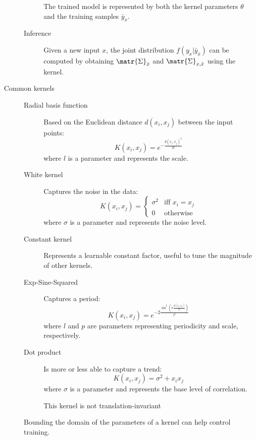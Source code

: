 \begin{description}
\begin{description}
                The trained model is represented by both the kernel parameters $\theta$ and the training samples $\bar{y}_x$.

            \item[Inference] 
                Given a new input $x$, the joint distribution $f(y_x | \bar{y}_{\bar{x}})$ can be computed by obtaining $\matr{\Sigma}_{\bar{x}}$ and $\matr{\Sigma}_{x, \bar{x}}$ using the kernel.
        \end{description}

    \item[Common kernels] \phantom{}
        \begin{description}
            \item[Radial basis function] 
                Based on the Euclidean distance $d(x_i, x_j)$ between the input points:
                \[ K(x_i, x_j) = e^{-\frac{d(x_i, x_j)^2}{2l}} \]
                where $l$ is a parameter and represents the scale.

            \item[White kernel]
                Captures the noise in the data:
                \[ K(x_i, x_j) = \begin{cases}
                    \sigma^2 & \text{iff $x_i = x_j$} \\
                    0 & \text{otherwise}
                \end{cases} \]
                where $\sigma$ is a parameter and represents the noise level.

            \item[Constant kernel]
                Represents a learnable constant factor, useful to tune the magnitude of other kernels.

            \item[Exp-Sine-Squared]
                Captures a period:
                \[ K(x_i, x_j) = e^{-2 \frac{\sin^2 \left( \pi \frac{d(x_i, x_j)}{p} \right)}{l^2}} \]
                where $l$ and $p$ are parameters representing periodicity and scale, respectively.

            \item[Dot product]
                Is more or less able to capture a trend:
                \[ K(x_i, x_j) = \sigma^2 + x_i x_j \]
                where $\sigma$ is a parameter and represents the base level of correlation.

                \begin{remark}
                    This kernel is not translation-invariant
                \end{remark}
        \end{description}

        \begin{remark}
            Bounding the domain of the parameters of a kernel can help control training.
        \end{remark}
\end{description}


